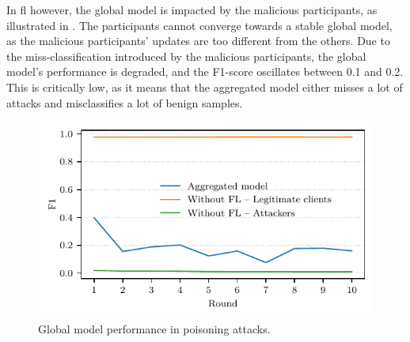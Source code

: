 In \gls{fl} however, the global model is impacted by the malicious participants, as illustrated in .
The participants cannot converge towards a stable global model, as the malicious participants' updates are too different from the others.
Due to the miss-classification introduced by the malicious participants, the global model's performance is degraded, and the F1-score oscillates between 0.1 and 0.2.
This is critically low, as it means that the aggregated model either misses a lot of attacks and misclassifies a lot of benign samples.

\begin{figure}
    \centering
    \includegraphics{figures/poisoning.pdf}
    \caption{Global model performance in poisoning attacks.}
    \label{fig:poisoning}
\end{figure}

